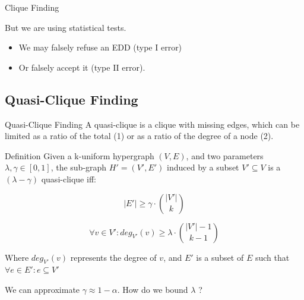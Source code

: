 \documentclass[10pt]{beamer}
\begin{document}
\begin{frame}{Clique Finding}
    \pause
    
    \begin{alertblock}{}
    But we are using statistical tests.
    
    \begin{itemize}
        \item We may falsely refuse an EDD (type I error)
        \item Or falsely accept it (type II error).
    \end{itemize}
    \end{alertblock}
\end{frame}


\subsection{Quasi-Clique Finding}
\begin{frame}{Quasi-Clique Finding}
    A quasi-clique is a clique with missing edges, which can be limited as a ratio of the total (1)
    or as a ratio of the degree of a node (2).

    \begin{alertblock}{Definition}
    Given a k-uniform hypergraph $(V,E)$, and two parameters $\lambda, \gamma \in [0,1]$,
    the sub-graph $H'=(V',E')$ induced by a subset $V' \subseteq V$ is a
    $(\lambda-\gamma)$ quasi-clique iff:
    
    \begin{equation}
        |E'| \ge \gamma \cdot \binom{|V'|}{k}
        \label{eq:edge_hyperclique}
    \end{equation}
    
    \begin{equation}
        \forall v \in V': deg_{V'}(v) \ge \lambda \cdot \binom{|V'| - 1}{k - 1}
        \label{eq:deg_hyperclique}
    \end{equation}

    Where $deg_{V'}(v)$ represents the degree of $v$, and $E'$ is a subset of $E$ such that
    $\forall e \in E' : e \subseteq V'$
    \end{alertblock}
    
    We can approximate $\gamma \approx 1 - \alpha$. How do we bound $\lambda$ ?
\end{frame}
\end{document}
